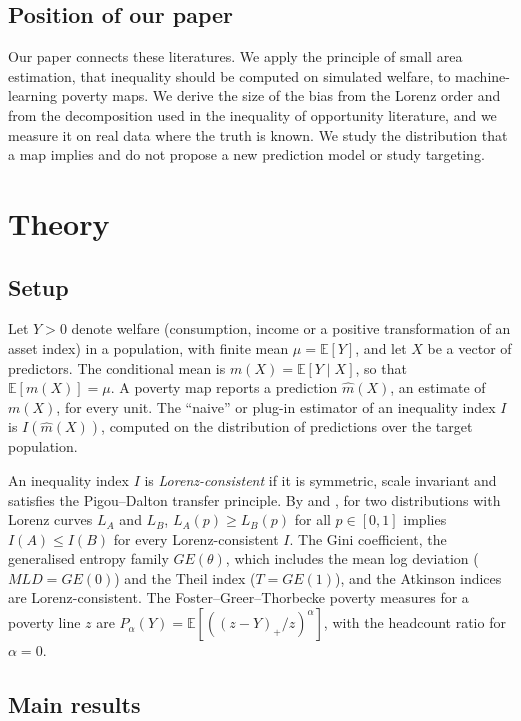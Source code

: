 \documentclass[pdflatex,sn-mathphys-ay]{sn-jnl}
\theoremstyle{thmstyleone}%
\theoremstyle{thmstyletwo}%
\theoremstyle{thmstylethree}%
\newcommand{\E}{\mathbb{E}}
\begin{document}
\subsection{Position of our paper}\label{sec:lit_position}
Our paper connects these literatures. We apply the principle of small area estimation, that inequality should be computed on simulated welfare, to machine-learning poverty maps. We derive the size of the bias from the Lorenz order and from the decomposition used in the inequality of opportunity literature, and we measure it on real data where the truth is known. We study the distribution that a map implies and do not propose a new prediction model or study targeting.

\section{Theory}\label{sec:theory}

\subsection{Setup}\label{sec:setup}

Let $Y>0$ denote welfare (consumption, income or a positive transformation of an asset index) in a population, with finite mean $\mu=\E[Y]$, and let $X$ be a vector of predictors. The conditional mean is $m(X)=\E[Y\mid X]$, so that $\E[m(X)]=\mu$. A poverty map reports a prediction $\hat m(X)$, an estimate of $m(X)$, for every unit. The ``naive'' or plug-in estimator of an inequality index $I$ is $I(\hat m(X))$, computed on the distribution of predictions over the target population.

An inequality index $I$ is \emph{Lorenz-consistent} if it is symmetric, scale invariant and satisfies the Pigou--Dalton transfer principle. By \citet{atkinson1970} and \citet{dasgupta1973}, for two distributions with Lorenz curves $L_A$ and $L_B$, $L_A(p)\geq L_B(p)$ for all $p\in[0,1]$ implies $I(A)\leq I(B)$ for every Lorenz-consistent $I$. The Gini coefficient, the generalised entropy family $GE(\theta)$, which includes the mean log deviation ($MLD=GE(0)$) and the Theil index ($T=GE(1)$), and the Atkinson indices are Lorenz-consistent. The Foster--Greer--Thorbecke poverty measures \citep{fgt1984} for a poverty line $z$ are $P_\alpha(Y)=\E[((z-Y)_+/z)^\alpha]$, with the headcount ratio for $\alpha=0$.

\subsection{Main results}\label{sec:props}
\end{document}
